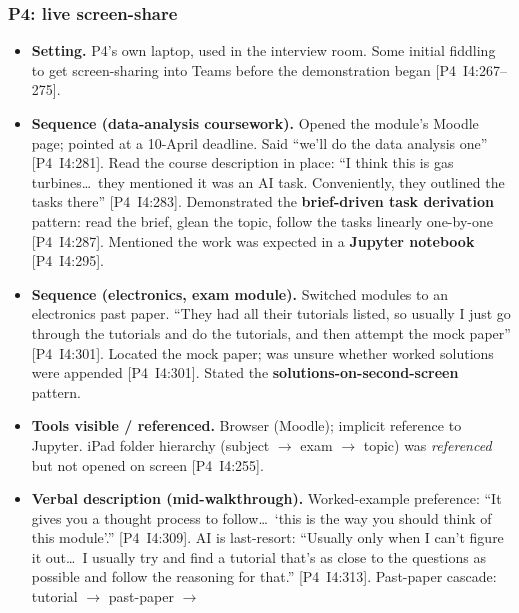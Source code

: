 \documentclass[a4paper,11pt]{article}
\begin{document}
\subsubsection*{P4: live screen-share}\label{app:obs-p4}
\begin{itemize}[leftmargin=1.2em,itemsep=2pt]
    \item \textbf{Setting.} P4's own laptop, used in the interview
          room. Some initial fiddling to get screen-sharing into Teams
          before the demonstration began [P4~I4:267--275].
    \item \textbf{Sequence (data-analysis coursework).} Opened the
          module's Moodle page; pointed at a 10-April deadline. Said
          ``we'll do the data analysis one'' [P4~I4:281]. Read the
          course description in place: ``I think this is gas
          turbines\dots\ they mentioned it was an AI task. Conveniently,
          they outlined the tasks there'' [P4~I4:283]. Demonstrated the
          \textbf{brief-driven task derivation} pattern: read the brief,
          glean the topic, follow the tasks linearly one-by-one
          [P4~I4:287]. Mentioned the work was expected in a
          \textbf{Jupyter notebook} [P4~I4:295].
    \item \textbf{Sequence (electronics, exam module).} Switched
          modules to an electronics past paper. ``They had all their
          tutorials listed, so usually I just go through the tutorials
          and do the tutorials, and then attempt the mock paper''
          [P4~I4:301]. Located the mock paper; was unsure whether
          worked solutions were appended [P4~I4:301]. Stated the
          \textbf{solutions-on-second-screen} pattern.
    \item \textbf{Tools visible / referenced.} Browser (Moodle);
          implicit reference to Jupyter. iPad folder hierarchy
          (subject $\rightarrow$ exam $\rightarrow$ topic) was
          \emph{referenced} but not opened on screen [P4~I4:255].
    \item \textbf{Verbal description (mid-walkthrough).} Worked-example
          preference: ``It gives you a thought process to
          follow\dots\ `this is the way you should think of this
          module'.'' [P4~I4:309]. AI is last-resort: ``Usually only
          when I can't figure it out\dots\ I usually try and find a
          tutorial that's as close to the questions as possible and
          follow the reasoning for that.'' [P4~I4:313]. Past-paper
          cascade: tutorial $\rightarrow$ past-paper $\rightarrow$

\end{itemize}
\end{document}
